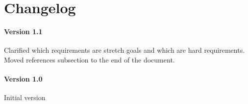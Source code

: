 \section{ Changelog }

\paragraph*{Version 1.1} Clarified which requirements are stretch goals and which are hard requirements. Moved references subsection to the end of the document.
\paragraph*{Version 1.0} Initial version
